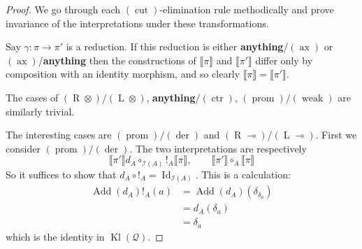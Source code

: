 \documentclass[runningheads]{llncs}
\newcommand{\call}[1]{\mathcal{#1}}
\newcommand{\lto}{\longrightarrow}
\newcommand{\rtensor}{(\operatorname{R}\otimes)}
\newcommand{\ltensor}{(\operatorname{L}\otimes)}
\newcommand{\prom}{(\operatorname{prom})}
\newcommand{\ctr}{(\operatorname{ctr})}
\newcommand{\der}{(\operatorname{der})}
\newcommand{\weak}{(\operatorname{weak})}
\newcommand{\cut}{(\operatorname{cut})}
\newcommand{\ax}{(\operatorname{ax})}
\begin{document}
\begin{proof}
We go through each $\cut$-elimination rule methodically and prove invariance of the interpretations under these transformations.

Say $\gamma: \pi \lto \pi'$ is a reduction. If this reduction is either \textbf{anything}/$\ax$ or $\ax$/\textbf{anything} then the constructions of $\llbracket \pi \rrbracket$ and $\llbracket \pi' \rrbracket$ differ only by composition with an identity morphism, and so clearly $\llbracket \pi \rrbracket = \llbracket \pi' \rrbracket$.

The cases of $\rtensor/\ltensor$, \textbf{anything}/$\ctr$, $\prom/\weak$ are similarly trivial.

The interesting cases are $\prom/\der$ and $(\operatorname{R}\multimap)$/$(\operatorname{L}\multimap)$. First we consider $\prom/\der$. The two interpretations are respectively
\begin{equation}
\llbracket \pi' \rrbracket d_A \circ_{\call{I}(A)} !_A \llbracket \pi \rrbracket,\qquad \llbracket \pi ' \rrbracket \circ_A \llbracket \pi \rrbracket
\end{equation}
So it suffices to show that $d_A \circ !_A = \operatorname{Id}_{\call{I}(A)}$. This is a calculation:
\begin{align*}
\operatorname{Add}(d_A)!_A(a) &= \operatorname{Add}(d_A)(\delta_{\delta_a})\\
&= d_A(\delta_a)\\
&= \delta_a
\end{align*}
which is the identity in $\operatorname{Kl}(\call{Q})$.


\end{proof}
\end{document}
